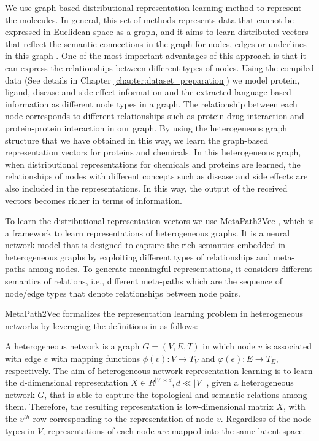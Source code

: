 We use graph-based distributional representation learning method to represent the molecules. In general, this set of methods represents data that cannot be expressed in Euclidean space as a graph, and it aims to learn distributed vectors that reflect the semantic connections in the graph for nodes, edges or underlines in this graph \cite{wu2019comprehensive}. One of the most important advantages of this approach is that it can express the relationships between different types of nodes. Using the compiled data (See details in Chapter \ref{chapter:dataset_preparation}) we model protein, ligand, disease and side effect information and the extracted language-based information as different node types in a graph. The relationship between each node corresponds to different relationships such as protein-drug interaction and protein-protein interaction in our graph. By using the heterogeneous graph structure that we have obtained in this way, we learn the graph-based representation vectors for proteins and chemicals. In this heterogeneous graph, when distributional representations for chemicals and proteins are learned, the relationships of nodes with different concepts such as disease and side effects are also included in the representations. In this way, the output of the received vectors becomes richer in terms of information. 

To learn the distributional representation vectors we use MetaPath2Vec \cite{dong2017metapath2vec, pal2016deep}, which is a framework to learn representations of heterogeneous graphs. It is a neural network model that is designed to capture the rich semantics embedded in heterogeneous graphs by exploiting different types of relationships and meta-paths among nodes. To generate meaningful representations, it considers different semantics of relations, i.e., different meta-paths which are the sequence of node/edge types that denote relationships between node pairs.

MetaPath2Vec formalizes the representation learning problem in heterogeneous networks by leveraging the definitions in \cite{dong2017metapath2vec, sun2013pathselclus} as follows:

A heterogeneous network is a graph $G = (V, E, T)$ in which node $v$ is associated with edge $e$ with mapping functions $\phi(v) : V \to T_{V}$ and $\varphi(e) : E \to T_{E}$, respectively. The aim of heterogeneous network representation learning is to learn the d-dimensional representation $X \in R^{|V|\times d}, d \ll |V|$ , given a heterogeneous network $G$, that is able to capture the topological and semantic relations among them. Therefore, the resulting representation is low-dimensional matrix $X$, with the $v^{th}$  row corresponding to the representation of node $v$. Regardless of the node types in $V$, representations of each node are mapped into the same latent space. 

